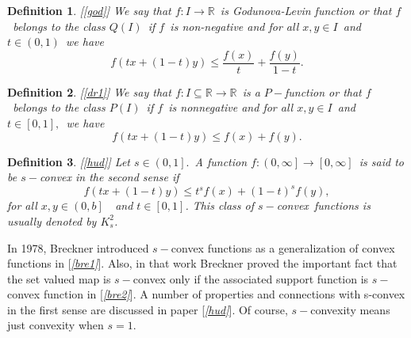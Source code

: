\documentclass{amsart}
\theoremstyle{plain}
\newtheorem{definition}{Definition}
\numberwithin{equation}{section}
\begin{document}
\begin{definition}
\bigskip \textit{[\ref{god}] We say that }$f:I\rightarrow 
\mathbb{R}
$\textit{\ is Godunova-Levin function or that }$f$\textit{\ belongs to the
class }$Q\left( I\right) $\textit{\ if }$f$\textit{\ is non-negative and for
all }$x,y\in I$\textit{\ and }$t\in \left( 0,1\right) $\textit{\ we have \ \
\ \ \ \ \ \ \ \ \ \ \ }\begin{equation}
f\left( tx+\left( 1-t\right) y\right) \leq \frac{f\left( x\right) }{t}+\frac{f\left( y\right) }{1-t}.  \label{103}
\end{equation}
\end{definition}

\begin{definition}
\textit{[\ref{dr1}] We say that }$f:I\subseteq 
\mathbb{R}
\rightarrow 
\mathbb{R}
$\textit{\ is a }$P-$\textit{function or that }$f$\textit{\ belongs to the
class }$P\left( I\right) $\textit{\ if }$f$\textit{\ is nonnegative and for
all }$x,y\in I$\textit{\ and }$t\in \left[ 0,1\right] ,$\textit{\ we have}\begin{equation}
f\left( tx+\left( 1-t\right) y\right) \leq f\left( x\right) +f\left(
y\right) .  \label{104}
\end{equation}
\end{definition}

\begin{definition}
\textit{[\ref{hud}] Let }$s\in \left( 0,1\right] .$\textit{\ A function }$f:\left( 0,\infty \right] \rightarrow \left[ 0,\infty \right] $\textit{\ is
said to be }$s-$\textit{convex in the second sense if \ \ \ \ \ \ \ \ \ \ \
\ }\begin{equation}
f\left( tx+\left( 1-t\right) y\right) \leq t^{s}f\left( x\right) +\left(
1-t\right) ^{s}f\left( y\right) ,  \label{105}
\end{equation}\textit{for all }$x,y\in \left( 0,b\right] $\textit{\ \ and }$t\in \left[ 0,1\right] $\textit{. This class of }$s-$convex\textit{\ functions is usually
denoted by }$K_{s}^{2}$\textit{.}
\end{definition}

In 1978, Breckner introduced $s-$convex functions as a generalization of
convex functions in [\textit{\ref{bre1}}]. Also, in that work Breckner
proved the important fact that the set valued map is $s-$convex only if the
associated support function is $s-$convex function in [\textit{\ref{bre2}}].
A number of properties and connections with s-convex in the first sense are
discussed in paper [\textit{\ref{hud}}]. Of course, $s-$convexity means just
convexity when $s=1$.
\end{document}
